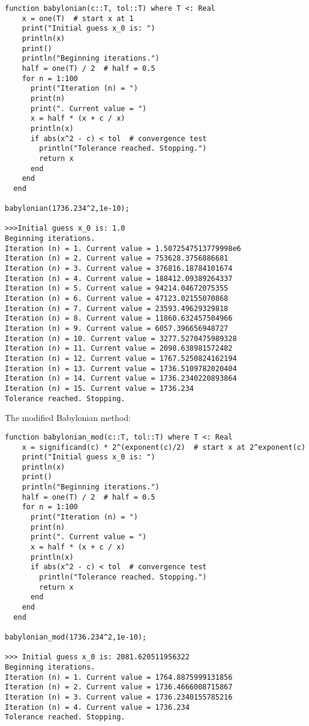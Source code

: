 \documentclass[8pt]{article}
\begin{document}
\begin{verbatim}
function babylonian(c::T, tol::T) where T <: Real
    x = one(T)  # start x at 1
    print("Initial guess x_0 is: ")
    println(x)
    print()
    println("Beginning iterations.")
    half = one(T) / 2  # half = 0.5
    for n = 1:100
      print("Iteration (n) = ")
      print(n)
      print(". Current value = ")
      x = half * (x + c / x)
      println(x)
      if abs(x^2 - c) < tol  # convergence test
        println("Tolerance reached. Stopping.")
        return x
      end
    end
  end

babylonian(1736.234^2,1e-10);

>>>Initial guess x_0 is: 1.0
Beginning iterations.
Iteration (n) = 1. Current value = 1.5072547513779998e6
Iteration (n) = 2. Current value = 753628.3756886681
Iteration (n) = 3. Current value = 376816.18784101674
Iteration (n) = 4. Current value = 188412.09389264337
Iteration (n) = 5. Current value = 94214.04672075355
Iteration (n) = 6. Current value = 47123.02155070868
Iteration (n) = 7. Current value = 23593.49629329818
Iteration (n) = 8. Current value = 11860.632457504966
Iteration (n) = 9. Current value = 6057.396656948727
Iteration (n) = 10. Current value = 3277.5270475989328
Iteration (n) = 11. Current value = 2098.638981572482
Iteration (n) = 12. Current value = 1767.5250824162194
Iteration (n) = 13. Current value = 1736.5109782020404
Iteration (n) = 14. Current value = 1736.2340220893864
Iteration (n) = 15. Current value = 1736.234
Tolerance reached. Stopping.
\end{verbatim}

The modified Babylonian method: 
\begin{verbatim}
function babylonian_mod(c::T, tol::T) where T <: Real
    x = significand(c) * 2^(exponent(c)/2)  # start x at 2^exponent(c)
    print("Initial guess x_0 is: ")
    println(x)
    print()
    println("Beginning iterations.")
    half = one(T) / 2  # half = 0.5
    for n = 1:100
      print("Iteration (n) = ")
      print(n)
      print(". Current value = ")
      x = half * (x + c / x)
      println(x)
      if abs(x^2 - c) < tol  # convergence test
        println("Tolerance reached. Stopping.")
        return x
      end
    end
  end

babylonian_mod(1736.234^2,1e-10);

>>> Initial guess x_0 is: 2081.620511956322
Beginning iterations.
Iteration (n) = 1. Current value = 1764.8875999131856
Iteration (n) = 2. Current value = 1736.4666008715867
Iteration (n) = 3. Current value = 1736.2340155785216
Iteration (n) = 4. Current value = 1736.234
Tolerance reached. Stopping.
\end{verbatim}
\end{document}
